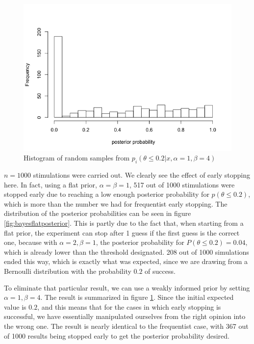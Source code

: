 \begin{figure}[h] 
\begin{center}
\includegraphics[scale=0.5]{bayesstop14allpost.png}
	\caption{Histogram of random samples from $p_i(\theta\leq 0.2|x,\alpha=1, \beta=4)$}
	\label{fig:bayes14posterior}
\end{center}	
\end{figure}

$n=1000$ stimulations were carried out. We clearly see the effect of early stopping here. In fact, using a flat prior, $\alpha=\beta=1$, 517 out of 1000 stimulations were stopped early due to reaching a low enough posterior probability for $p(\theta \leq 0.2)$, which is more than the number we had for frequentist early stopping. The distribution of the posterior probabilities can be seen in figure \ref{fig:bayesflatposterior}. This is partly due to the fact that, when starting from a flat prior, the  experiment can stop after 1 guess if the first guess is the correct one, because with $\alpha = 2, \beta=1$, the posterior probability for $P(\theta\leq 0.2) = 0.04$, which is already lower than the threshold designated. 208 out of 1000 simulations ended this way, which is exactly what was expected, since we are drawing from a Bernoulli distribution with the probability $0.2$ of success. 

To eliminate that particular result, we can use a weakly informed prior by setting $\alpha = 1, \beta=4$. The result is summarized in figure \ref{fig:bayes14posterior}. Since the initial expected value is $0.2$, and this means that for the cases in which early stopping is successful, we have essentially manipulated ourselves from the right opinion into the wrong one. The result is nearly identical to the frequentist case, with 367 out of 1000 results being stopped early to get the posterior probability desired.


